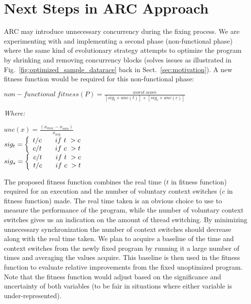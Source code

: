 \section{Next Steps in ARC Approach}
\label{sec:ongoing}

ARC may introduce unnecessary concurrency during the fixing process. We are
experimenting with and implementing a second phase (non-functional phase) where
the same kind of evolutionary strategy attempts to optimize the program by
shrinking and removing concurrency blocks (solves issues as illustrated in
Fig.~\ref{fig:optimized_sample_datarace} back in Sect.~\ref{sec:motivation}). A
new fitness function would be required for this non-functional phase:

\begin{footnotesize}
\begin{center}
$non-functional\ fitness(P) = \frac{worst\ score}{[sig_t \times unc(t)] + [sig_c \times unc(c)]}$
\end{center}
\vspace{0.1cm} \textit{Where:} \vspace{0.1cm}
\end{footnotesize}
\begin{scriptsize}
\begin{center}
$unc(x) = \frac{(x_{max} - x_{min})}{x_{avg}}$ \\ \vspace{0.2cm}
$
 sig_t = \left\{
 \begin{array}{l l}
   t/c & \quad if\ t\ > c \\
   c/t & \quad if\ c\ > t \\
 \end{array} \right.
$ \\ \vspace{0.2cm}
$
 sig_s = \left\{
 \begin{array}{l l}
   c/t & \quad if\ t\ > c \\
   t/c & \quad if\ c\ > t \\
 \end{array} \right.
$ \\
\end{center}
\end{scriptsize}


\noindent The proposed fitness function combines the real time ($t$ in fitness function) required for an execution and the number of
voluntary context switches ($c$ in fitness function) made. The real time taken is an obvious choice to
use to measure the performance of the program, while the number of voluntary
context switches gives us an indication on the amount of thread switching. By
minimizing unnecessary synchronization the number of context switches should
decrease along with the real time taken. We plan to acquire a baseline of the
time and context switches from the newly fixed program by running it a large
number of times and averaging the values acquire. This baseline is then used in
the fitness function to evaluate relative improvements from the fixed
unoptimized program. Note that the fitness function would adjust based on the
significance and uncertainty of both variables (to be fair in situations where
either variable is under-represented).

